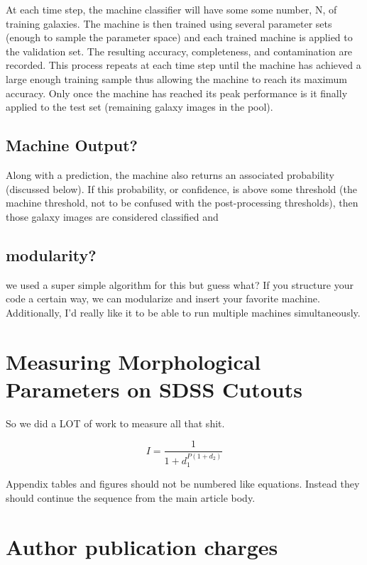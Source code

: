 \documentclass[twocolumn]{aastex6}
\begin{document}
At each time step, the machine classifier will have some some number, N, of training galaxies. The machine is then trained using several parameter sets (enough to sample the parameter space) and each trained machine is applied to the validation set. The resulting accuracy, completeness, and contamination are recorded. This process repeats at each time step until the machine has achieved a large enough training sample thus allowing the machine to reach its maximum accuracy. Only once the machine has reached its peak performance is it finally applied to the test set (remaining galaxy images in the pool). 

\subsection{Machine Output?}
Along with a prediction, the machine also returns an associated probability (discussed below). If this probability, or confidence, is above some threshold (the machine threshold, not to be confused with the post-processing thresholds), then those galaxy images are considered classified and



\subsection{modularity?}
we used a super simple algorithm for this but guess what? If you structure your code a certain way, we can modularize and insert your favorite machine. Additionally, I'd really like it to be able to run multiple machines simultaneously. 

\appendix

\section{Measuring Morphological Parameters on SDSS Cutouts}

So we did a LOT of work to measure all that shit. 

\begin{equation}
I = \frac{1}{1 + d_{1}^{P (1 + d_{2} )}}
\end{equation}

Appendix tables and figures should not be numbered like equations. Instead
they should continue the sequence from the main article body.

\section{Author publication charges} \label{sec:pubcharge}
\end{document}
